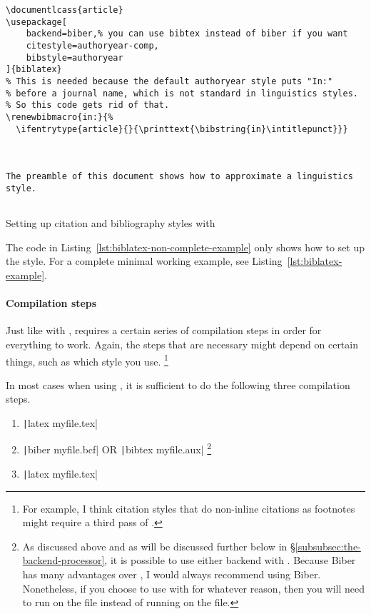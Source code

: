 \begin{listing}[htbp]
	\centering
	\begin{verbatim}
\documentlcass{article}
\usepackage[
    backend=biber,% you can use bibtex instead of biber if you want
    citestyle=authoryear-comp,
    bibstyle=authoryear
]{biblatex}
% This is needed because the default authoryear style puts "In:" 
% before a journal name, which is not standard in linguistics styles.
% So this code gets rid of that.
\renewbibmacro{in:}{%
  \ifentrytype{article}{}{\printtext{\bibstring{in}\intitlepunct}}}



The preamble of this document shows how to approximate a linguistics style.


	\end{verbatim}
	\caption{Setting up citation and bibliography styles with }
	\label{lst:biblatex-non-complete-example}
\end{listing}

The code in Listing~\ref{lst:biblatex-non-complete-example} only shows how to set up the style.
For a complete minimal working example, see Listing~\ref{lst:biblatex-example}.

\paragraph{Compilation steps}

Just like with ,  requires a certain series of compilation steps in order for everything to work.
Again, the steps that are necessary might depend on certain things, such as which style you use.%
\footnote{%
For example, I think citation styles that do non-inline citations as footnotes might require a third pass of .%
}

In most cases when using , it is sufficient to do the following three compilation steps.

\begin{enumerate}[label={(\roman*)}]

	\item{\texttt|latex myfile.tex|}
	
	\item{\texttt|biber myfile.bcf| OR \texttt|bibtex myfile.aux|%
	\footnote{%
	\label{fn:backends-with-biblatex}
	As discussed above and as will be discussed further below in \S\ref{subsubsec:the-backend-processor}, it is possible to use either backend with .
	Because Biber has many advantages over , I would always recommend using Biber.
	Nonetheless, if you choose to use  with  for whatever reason, then you will need to run  on the  file instead of running  on the  file.%
	}
	}
	
	\item{\texttt|latex myfile.tex|}

\end{enumerate}

